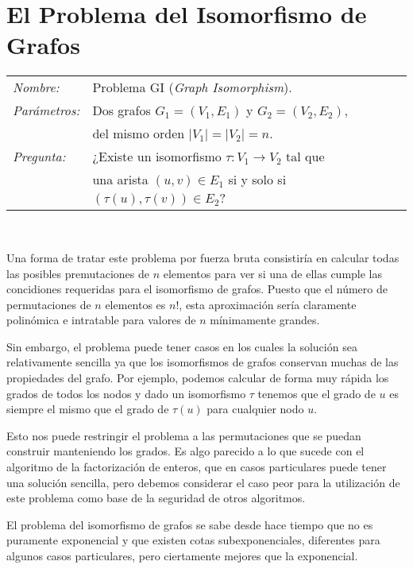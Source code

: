 \section{El Problema del Isomorfismo de Grafos}

\hfil

\begin{tabular}{|ll}
	\textit{Nombre:} & Problema GI ({\em Graph Isomorphism}). \\
	\textit{Parámetros:} & Dos grafos $G_1 = (V_1, E_1)$ y $G_2 = (V_2, E_2)$,
	\\ & del mismo orden $\mid V_1 \mid = \mid V_2 \mid = n$. \\
	\textit{Pregunta:} & ¿Existe un isomorfismo $\tau : V_1 \rightarrow V_2$
	tal que \\ & una arista $(u,v)\in E_1$ si y solo si $(\tau (u),\tau (v))
	\in E_2$? \\
\end{tabular}
\\

\hfil

Una forma de tratar este problema por fuerza bruta consistir\'ia en calcular
todas las posibles premutaciones de $n$ elementos para ver si una de ellas
cumple las concidiones requeridas para el isomorfismo de grafos. Puesto que el
n\'umero de permutaciones de $n$ elementos es $n!$, esta aproximaci\'on ser\'ia
claramente polin\'omica e intratable para valores de $n$ m\'inimamente grandes.

Sin embargo, el problema puede tener casos en los cuales la soluci\'on sea
relativamente sencilla ya que los isomorfismos de grafos conservan muchas de las
propiedades del grafo. Por ejemplo, podemos calcular de forma muy r\'apida los
grados de todos los nodos y dado un isomorfismo $\tau$ tenemos que el grado de
$u$ es siempre el mismo que el grado de $\tau(u)$ para cualquier nodo $u$.

Esto nos puede restringir el problema a las permutaciones que se puedan construir
manteniendo los grados. Es algo parecido a lo que sucede con el algoritmo de la factorizaci\'on de enteros,
que en casos particulares puede tener una soluci\'on sencilla, pero debemos considerar
el caso peor para la utilizaci\'on de este problema como base de la seguridad de otros algoritmos.

El problema del isomorfismo de grafos se sabe desde hace tiempo que no es puramente
exponencial y que existen cotas subexponenciales, diferentes para algunos casos particulares,
pero ciertamente mejores que la exponencial.

